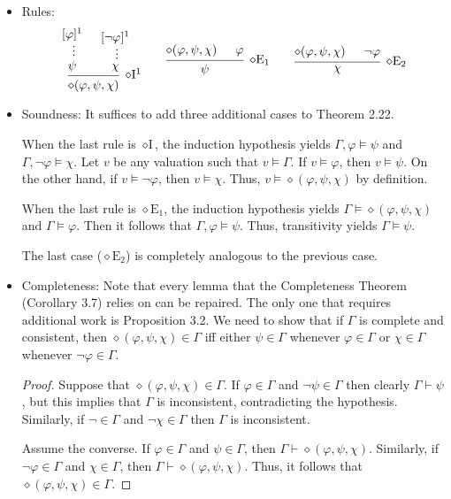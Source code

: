 \documentclass[a4paper]{article}
\begin{document}
\section{}
\begin{itemize}
\item Rules:
  \[
    \begin{prooftree}
      \hypo{[\varphi]^{1}}
      \ellipsis{}{\psi}
      \hypo{[\lnot\varphi]^{1}}
      \ellipsis{}{\chi}
      \infer2[$\diamond$I$^1$]{\diamond(\varphi,\psi,\chi)}
    \end{prooftree}
    \qquad
    \begin{prooftree}
      \hypo{\diamond(\varphi,\psi,\chi)}
      \hypo{\varphi}
      \infer2[$\diamond$E$_{1}$]{\psi}
    \end{prooftree}
    \qquad
    \begin{prooftree}
      \hypo{\diamond(\varphi,\psi,\chi)}
      \hypo{\lnot\varphi}
      \infer2[$\diamond$E$_{2}$]{\chi}
    \end{prooftree}
  \]
\item Soundness: It suffices to add three additional cases to Theorem 2.22.

  When the last rule is $\diamond\text{I}$, the induction hypothesis yields $\Gamma,\varphi \models \psi$ and $\Gamma,\lnot\varphi \models \chi$.
  Let $v$ be any valuation such that $v \models \Gamma$.
  If $v \models \varphi$, then $v \models \psi$.
  On the other hand, if $v \models \lnot\varphi$, then $v \models \chi$.
  Thus, $v \models \diamond(\varphi,\psi,\chi)$ by definition.

  When the last rule is $\diamond\text{E}_{1}$, the induction hypothesis yields $\Gamma \models \diamond(\varphi,\psi,\chi)$ and $\Gamma \models \varphi$.
  Then it follows that $\Gamma,\varphi \models \psi$.
  Thus, transitivity yields $\Gamma \models \psi$.

  The last case ($\diamond\text{E}_{2}$) is completely analogous to the previous case.
\item Completeness: Note that every lemma that the Completeness Theorem (Corollary 3.7) relies on can be repaired.
  The only one that requires additional work is Proposition 3.2.
  We need to show that if $\Gamma$ is complete and consistent, then $\diamond(\varphi,\psi,\chi) \in \Gamma$ iff either $\psi \in \Gamma$ whenever $\varphi \in \Gamma$ or $\chi \in \Gamma$ whenever $\lnot \varphi \in \Gamma$.
  \begin{proof}
    Suppose that $\diamond(\varphi,\psi,\chi) \in \Gamma$.
    If $\varphi \in \Gamma$ and $\lnot\psi \in \Gamma$ then clearly $\Gamma \vdash \psi$, but this implies that $\Gamma$ is inconsistent, contradicting the hypothesis.
    Similarly, if $\lnot \in \Gamma$ and $\lnot \chi \in \Gamma$ then $\Gamma$ is inconsistent.

    Assume the converse.
    If $\varphi \in \Gamma$ and $\psi \in \Gamma$, then $\Gamma \vdash \diamond(\varphi,\psi,\chi)$.
    Similarly, if $\lnot\varphi \in \Gamma$ and $\chi \in \Gamma$, then $\Gamma \vdash \diamond(\varphi,\psi,\chi)$.
    Thus, it follows that $\diamond(\varphi,\psi,\chi) \in \Gamma$.
  \end{proof}
\end{itemize}

\end{document}
